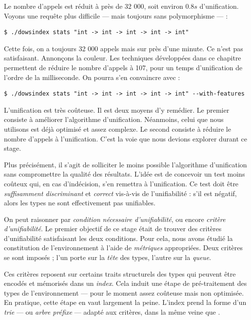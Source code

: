 \documentclass[a4paper]{report}
\theoremstyle{definition}
\begin{document}
Le nombre d'appels est réduit à près de 32 000, soit environ $0.8s$ d'unification. Voyons une requête plus difficile — mais toujours sans polymorphisme — :

\begin{verbatim}
$ ./dowsindex stats "int -> int -> int -> int -> int"
\end{verbatim}

Cette fois, on a toujours 32 000 appels mais sur près d'une minute. Ce n'est pas satisfaisant. Annonçons la couleur. Les techniques développées dans ce chapitre permettent de réduire le nombre d'appels à 107, pour un temps d'unification de l'ordre de la milliseconde. On pourra s'en convaincre avec :

\begin{verbatim}
$ ./dowsindex stats "int -> int -> int -> int -> int" --with-features
\end{verbatim}

L'unification est très coûteuse. Il est deux moyens d'y remédier. Le premier consiste à améliorer l'algorithme d'unification. Néanmoins, celui que nous utilisons est déjà optimisé et assez complexe. Le second consiste à réduire le nombre d'appels à l'unification. C'est la voie que nous devions explorer durant ce stage.

Plus précisément, il s'agit de solliciter le moins possible l'algorithme d'unification sans compromettre la qualité des résultats. L'idée est de concevoir un test moins coûteux qui, en cas d'indécision, s'en remettra à l'unification. Ce test doit être \emph{suffisamment discriminant} et \emph{correct} vis-à-vis de l'unifiabilité : s'il est négatif, alors les types ne sont effectivement pas unifiables.

On peut raisonner par \emph{condition nécessaire d'unifiabilité}, ou encore \emph{critère d'unifiabilité}. Le premier objectif de ce stage était de trouver des critères d'unifiabilité satisfaisant les deux conditions. Pour cela, nous avons étudié la constitution de l'environnement à l'aide de \emph{métriques} appropriées. Deux critères se sont imposés ; l'un porte sur la \emph{tête} des types, l'autre sur la \emph{queue}.

Ces critères reposent sur certains traits structurels des types qui peuvent être encodés et mémorisés dans un \emph{index}. Cela induit une étape de pré-traitement des types de l'environnement — pour le moment assez coûteuse mais non optimisée. En pratique, cette étape en vaut largement la peine. L'index prend la forme d'un \emph{trie} — ou \emph{arbre préfixe} — adapté aux critères, dans la même veine que \cite{Schulz}.
\end{document}
